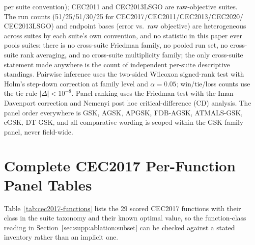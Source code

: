 \documentclass[algorithms,article,submit,moreauthors,pdftex]{Definitions/mdpi}
\newcommand{\dtgsk}{DT-GSK}
\newcommand{\atmals}{ATMALS-GSK}
\newcommand{\agsk}{AGSK}
\newcommand{\apgsk}{APGSK}
\newcommand{\fdbagsk}{FDB-AGSK}
\newcommand{\egsk}{eGSK}
\begin{document}
per suite convention); CEC2011 and CEC2013LSGO are raw-objective suites.
The run counts (51/25/51/30/25 for CEC2017/CEC2011/CEC2013/CEC2020/%
CEC2013LSGO) and endpoint bases (error vs.\ raw objective) are
heterogeneous across suites by each suite's own convention, and no
statistic in this paper ever pools suites: there is no cross-suite
Friedman family, no pooled run set, no cross-suite rank averaging, and no
cross-suite multiplicity family; the only cross-suite statement made
anywhere is the count of independent per-suite descriptive standings.
Pairwise inference uses the two-sided Wilcoxon signed-rank
test with Holm's step-down
correction at family level and $\alpha = 0.05$;
win/tie/loss counts use the tie rule $|\Delta| < 10^{-8}$.
Panel ranking uses the Friedman test with the
Iman--Davenport correction and Nemenyi post hoc critical-difference (CD)
analysis.
The panel order everywhere is GSK, \agsk{}, \apgsk{}, \fdbagsk{},
\atmals{}, \egsk{}, \dtgsk{}, and all comparative wording is scoped
within the GSK-family panel, never field-wide.

\section{Complete CEC2017 Per-Function Panel Tables}\label{sec:supp:cec2017-tables}

Table~\ref{tab:cec2017-functions} lists the 29 scored CEC2017 functions with
their class in the suite taxonomy and their known optimal value, so the
function-class reading in Section~\ref{sec:supp:ablation:subset} can be checked
against a stated inventory rather than an implicit one.

\begin{table}[H]
\caption{CEC2017 scored-function inventory: class and known optimal value
$f^{*}$ for each of the 29 scored functions. The class boundaries and the
$f^{*}(F_{i}) = 100i$ rule are read from the benchmark suite definition
(benchmarks/cec\_suite\_python/cec2017/functions.py), not from a
secondary source. F2 is excluded under the adopted protocol because of
documented instability, uniformly in every panel cell, and so does not
appear.}\label{tab:cec2017-functions}
\centering
\tablesize{\footnotesize}

\end{table}
\end{document}
